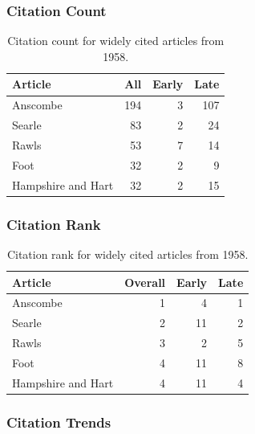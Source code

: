 \documentclass[
  10pt,
  letterpaper,
  DIV=11,
  numbers=noendperiod,
  twoside]{scrartcl}
\begin{document}
\subsubsection*{Citation Count}\label{sec-count-1958}

\begin{longtable}[]{@{}lrrr@{}}

\caption{\label{tbl-citation-count-1958}Citation count for widely cited
articles from 1958.}

\tabularnewline

\toprule\noalign{}
Article & All & Early & Late \\
\midrule\noalign{}
\endhead
\bottomrule\noalign{}
\endlastfoot
Anscombe & 194 & 3 & 107 \\
Searle & 83 & 2 & 24 \\
Rawls & 53 & 7 & 14 \\
Foot & 32 & 2 & 9 \\
Hampshire and Hart & 32 & 2 & 15 \\

\end{longtable}

\subsubsection*{Citation Rank}\label{sec-rank-1958}

\begin{longtable}[]{@{}lrrr@{}}

\caption{\label{tbl-citation-rank-1958}Citation rank for widely cited
articles from 1958.}

\tabularnewline

\toprule\noalign{}
Article & Overall & Early & Late \\
\midrule\noalign{}
\endhead
\bottomrule\noalign{}
\endlastfoot
Anscombe & 1 & 4 & 1 \\
Searle & 2 & 11 & 2 \\
Rawls & 3 & 2 & 5 \\
Foot & 4 & 11 & 8 \\
Hampshire and Hart & 4 & 11 & 4 \\

\end{longtable}

\subsubsection*{Citation Trends}\label{sec-trends-1958}
\end{document}
